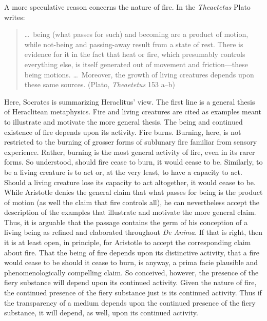 A more speculative reason concerns the nature of fire. In the \emph{Theaetetus} Plato writes:
\begin{quote}
	\ldots\ being (what passes for such) and becoming are a product of motion, while not-being and passing-away result from a state of rest. There is evidence for it in the fact that heat or fire, which presumably controls everything else, is itself generated out of movement and friction---these being motions. \ldots\ Moreover, the growth of living creatures depends upon these same sources. (Plato, \emph{Theaetetus} 153 a--b)
\end{quote}
Here, Socrates is summarizing Heraclitus' view. The first line is a general thesis of Heraclitean metaphysics. Fire and living creatures are cited as examples meant to illustrate and motivate the more general thesis. The being and continued existence of fire depends upon its activity. Fire burns. Burning, here, is not restricted to the burning of grosser forms of sublunary fire familiar from sensory experience. Rather, burning is the most general activity of fire, even in its rarer forms. So understood, should fire cease to burn, it would cease to be. Similarly, to be a living creature is to act or, at the very least, to have a capacity to act. Should a living creature lose its capacity to act altogether, it would cease to be. While Aristotle denies the general claim that what passes for being is the product of motion (as well the claim that fire controls all), he can nevertheless accept the description of the examples that illustrate and motivate the more general claim. Thus, it is arguable that the passage contains the germ of his conception of a living being as refined and elaborated throughout \emph{De Anima}. If that is right, then it is at least open, in principle, for Aristotle to accept the corresponding claim about fire. That the being of fire depends upon its distinctive activity, that a fire would cease to be should it cease to burn, is anyway, a prima facie plausible and phenomenologically compelling claim. So conceived, however, the presence of the fiery substance will depend upon its continued activity. Given the nature of fire, the continued presence of the fiery substance just is its continued activity. Thus if the transparency of a medium depends upon the continued presence of the fiery substance, it will depend, as well, upon its continued activity. 

